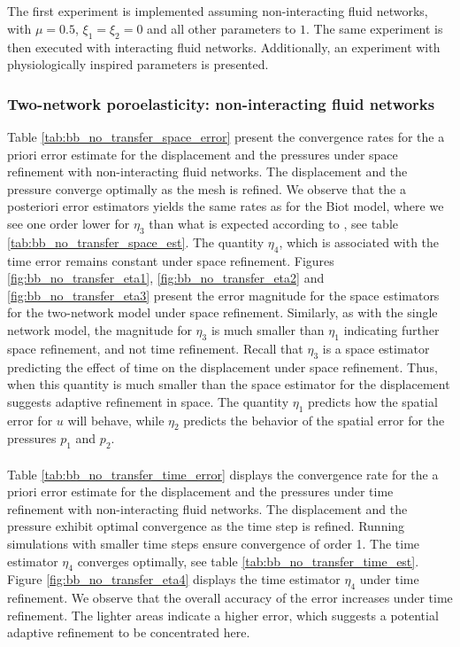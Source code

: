 \\
\\
The first experiment is implemented assuming non-interacting fluid networks, with $\mu = 0.5$, $\xi_1 = \xi_2 = 0$ and all other parameters to $1$. The same experiment is then executed with interacting fluid networks. Additionally, an experiment with physiologically inspired parameters is presented.  

\subsubsection{Two-network poroelasticity: non-interacting fluid networks}
Table \ref{tab:bb_no_transfer_space_error} present the convergence rates for the a priori error estimate for the displacement and the pressures under space refinement with non-interacting fluid networks. The displacement and the pressure converge optimally as the mesh is refined. We observe that the a posteriori error estimators yields the same rates as for the Biot model, where we see one order lower for $\eta_3$ than what is expected according to \cite{meunier}, see table \ref{tab:bb_no_transfer_space_est}. The quantity $\eta_4$, which is associated with the time error remains constant under space refinement. Figures \ref{fig:bb_no_transfer_eta1}, \ref{fig:bb_no_transfer_eta2} and \ref{fig:bb_no_transfer_eta3} present the error magnitude for the space estimators for the two-network model under space refinement. Similarly, as with the single network model, the magnitude for $\eta_3$ is much smaller than $\eta_1$ indicating further space refinement, and not time refinement. Recall that $\eta_3$ is a space estimator predicting the effect of time on the displacement under space refinement. Thus, when this quantity is much smaller than the space estimator for the displacement suggests adaptive refinement in space. The quantity $\eta_1$ predicts how the spatial error for $u$ will behave, while $\eta_2$ predicts the behavior of the spatial error for the pressures $p_1$ and $p_2$.
\\
\\
Table \ref{tab:bb_no_transfer_time_error} displays the convergence rate for the a priori error estimate for the displacement and the pressures under time refinement with non-interacting fluid networks. The displacement and the pressure exhibit optimal convergence as the time step is refined. Running simulations with smaller time steps ensure convergence of order 1. The time estimator $\eta_4$ converges optimally, see table \ref{tab:bb_no_transfer_time_est}. Figure \ref{fig:bb_no_transfer_eta4} displays the time estimator $\eta_4$ under time refinement. We observe that the overall accuracy of the error increases under time refinement. The lighter areas indicate a higher error, which suggests a potential adaptive refinement to be concentrated here. 
